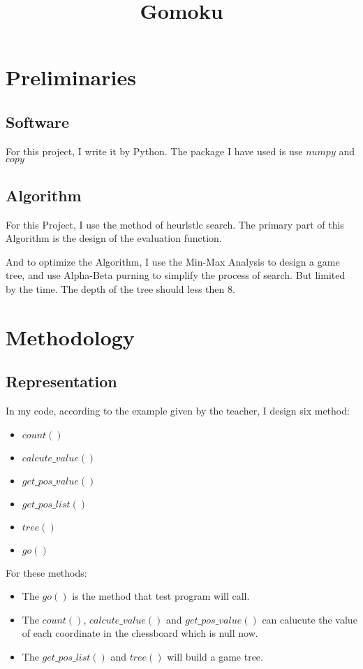 \documentclass[conference,compsoc]{IEEEtran}
\begin{document}
\title{Gomoku}
\author{
}
\maketitle
\IEEEpeerreviewmaketitle



\section{Preliminaries}

\subsection{Software}
For this project, I write it by Python. The package I have used is use $numpy$ and $copy$
\subsection{Algorithm}
For this Project, I use the method of heurlstlc search. The primary part of this Algorithm is the design of the 
evaluation function.  

And to optimize the Algorithm, I use the Min-Max Analysis to design a game tree, and use Alpha-Beta purning to simplify the process of search. 
But limited by the time. The depth of the tree should less then 8.

\section{Methodology}
\subsection{Representation}
In my code, according to the example given by the teacher, I design six method:  
\begin{itemize}
  \item $count()$
  \item $calcute\_value()$
  \item $get\_pos\_value()$
  \item $get\_pos\_list()$
  \item $tree()$
  \item $go()$
\end{itemize}
For these methods:
\begin{itemize}
  \item The $go()$ is the method that test program will call.
  \item The $count()$, $calcute\_value()$ and $get\_pos\_value()$ can calucute the value of each coordinate in the chessboard which is null now.
  \item The $get\_pos\_list()$ and $tree()$ will build a game tree.
\end{itemize}
\end{document}
